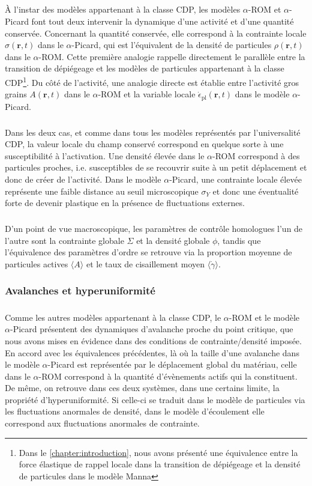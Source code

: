 \subparagraph{}\`A l'instar des modèles appartenant à la classe CDP, les modèles $\alpha$-ROM et $\alpha$-Picard font tout deux intervenir la dynamique d'une activité et d'une quantité conservée. Concernant la quantité conservée, elle correspond à la contrainte locale $\sigma(\mathbf{r},t)$ dans le $\alpha$-Picard, qui est l'équivalent de la densité de particules $\rho(\mathbf{r}, t)$ dans le $\alpha$-ROM. Cette première analogie rappelle directement le parallèle entre la transition de dépiégeage et les modèles de particules appartenant à la classe CDP\footnote{Dans le \autoref{chapter:introduction}, nous avons présenté une équivalence entre la force élastique de rappel locale dans la transition de dépiégeage et la densité de particules dans le modèle Manna}. Du côté de l'activité, une analogie directe est établie entre l'activité gros grains $A(\mathbf{r}, t)$ dans le $\alpha$-ROM et la variable locale $\dot{\epsilon}_\text{pl}(\mathbf{r}, t)$ dans le modèle $\alpha$-Picard.

\subparagraph{}Dans les deux cas, et comme dans tous les modèles représentés par l'universalité CDP, la valeur locale du champ conservé correspond en quelque sorte à une susceptibilité à l'activation. Une densité élevée dans le $\alpha$-ROM correspond à des particules proches, i.e. susceptibles de se recouvrir suite à un petit déplacement et donc de créer de l'activité. Dans le modèle $\alpha$-Picard, une contrainte locale élevée représente une faible distance au seuil microscopique $\sigma_Y$ et donc une éventualité forte de devenir plastique en la présence de fluctuations externes.

\subparagraph{}D'un point de vue macroscopique, les paramètres de contrôle homologues l'un de l'autre sont la contrainte globale $\Sigma$ et la densité globale $\phi$, tandis que l'équivalence des paramètres d'ordre se retrouve via la proportion moyenne de particules actives $\langle A \rangle $ et le taux de cisaillement moyen $\langle \dot{\gamma}\rangle$.

\subsubsection{Avalanches et hyperuniformité}

\subparagraph{}Comme les autres modèles appartenant à la classe CDP, le $\alpha$-ROM et le modèle $\alpha$-Picard présentent des dynamiques d'avalanche proche du point critique, que nous avons mises en évidence dans des conditions de contrainte/densité imposée. En accord avec les équivalences précédentes, là où la taille d'une avalanche dans le modèle $\alpha$-Picard est représentée par le déplacement global du matériau, celle dans le $\alpha$-ROM correspond à la quantité d'évènements actifs qui la constituent. De même, on retrouve dans ces deux systèmes, dans une certains limite, la propriété d'hyperuniformité. Si celle-ci se traduit dans le modèle de particules via les fluctuations anormales de densité, dans le modèle d'écoulement elle correspond aux fluctuations anormales de contrainte.

